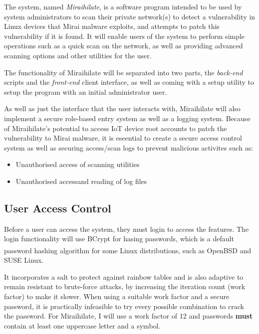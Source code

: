 The system, named \textit{Miraihilate}, is a software program intended to be used by system administrators to scan their private network(s) to detect a vulnerability in Linux devices that Mirai malware exploits, and attempts to patch this vulnerability if it is found. It will enable users of the system to perform simple operations such as a quick scan on the network, as well as providing advanced scanning options and other utilities for the user.

\vspace{0.5cm}

The functionality of Miraihilate will be separated into two parts, the \textit{back-end} scripts and the \textit{front-end} client interface, as well as coming with a setup utility to setup the program with an initial administrator user.

\vspace{0.5cm}

As well as just the interface that the user interacts with, Miraihilate will also implement a secure role-based entry system as well as a logging system. Because of Miraihilate's potential to access IoT device root accounts to patch the vulnerability to Mirai malware, it is eseential to create a secure access control system as well as securing access/scan logs to prevent malicious activites such as:
\begin{itemize}
	\item{Unauthorised access of scanning utilities}
	\item{Unauthorised accessand reading of log files}
\end{itemize}

\subsection{User Access Control}

Before a user can access the system, they must login to access the features. The login functionality will use BCrypt for hasing passwords, which is a default password hashing algorithm for some Linux distributions, such as OpenBSD\textsuperscript{\cite{openbsdbcrypt}} and SUSE Linux.

\vspace{0.5cm}

It incorporates a salt to protect against rainbow tables and is also adaptive to remain resistant to brute-force attacks, by increasing the iteration count (work factor) to make it slower. When using a suitable work factor and a secure password, it is practically infeasible to try every possible combination to crack the password. For Miraihilate, I will use a work factor of 12 and passwords \textbf{must} contain at least one uppercase letter and a symbol.

